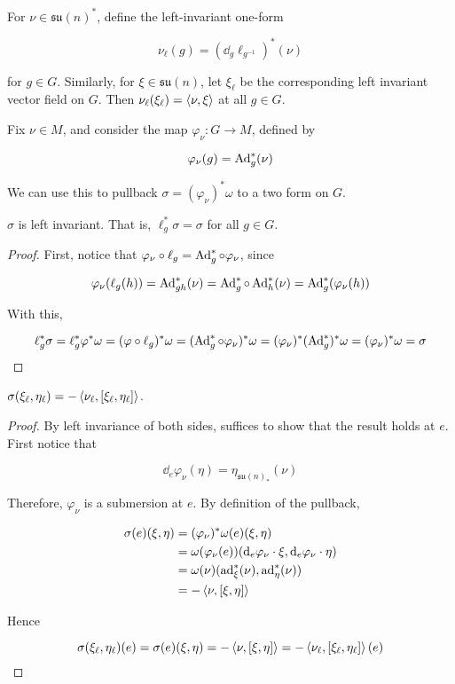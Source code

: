 \documentclass{article}
\newcommand{\su}{\mathfrak{su}}
\begin{document}
For \(\nu \in \su(n)^*\), define the left-invariant one-form

\[\nu_\ell(g) = (\dd_g\ell_{g^{-1}})^*(\nu)\]

for \(g \in G\). Similarly, for \(\xi \in \su(n)\), let \(\xi_\ell\) be the corresponding left invariant vector field on \(G\). Then \(\nu_\ell(\xi_\ell) = \left\langle \nu, \xi \right\rangle\) at all \(g \in G\).

Fix \(\nu \in  M\), and consider the map \(\varphi_\nu : G \to  M\), defined by

\[\varphi_\nu(g) = \operatorname{Ad}_g^*(\nu)\]

We can use this to pullback \(\sigma = (\varphi_\nu)^*\omega\) to a two form on \(G\).

\begin{lemma}
    \(\sigma\) is left invariant. That is, \(\ell_g^*\sigma = \sigma\) for all \(g \in G\).
\end{lemma}

\begin{proof}
    First, notice that \(\varphi_\nu \circ \ell_g = \operatorname{Ad}_g^* \circ \varphi_\nu\), since

    \[\varphi_\nu(\ell_g(h)) = \operatorname{Ad}_{gh}^*(\nu) = \operatorname{Ad}_g^*\circ \operatorname{Ad}_h^*(\nu) = \operatorname{Ad}_g^*(\varphi_\nu(h))\]

    With this,

    \[\ell_g^*\sigma = \ell_g^*\varphi^*\omega = (\varphi\circ\ell_g)^*\omega = (\operatorname{Ad}_g^* \circ \varphi_\nu)^*\omega = (\varphi_\nu)^*(\operatorname{Ad}_g^*)^*\omega = (\varphi_\nu)^*\omega = \sigma\]
\end{proof}

\begin{lemma}
    \(\sigma(\xi_\ell, \eta_\ell) = -\left\langle \nu_\ell, [\xi_\ell, \eta_\ell] \right\rangle\).
\end{lemma}

\begin{proof}
    By left invariance of both sides, suffices to show that the result holds at \(e\). First notice that

    \[\dd_e\varphi_\nu(\eta) = \eta_{\su(n)_*}(\nu)\]

    Therefore, \(\varphi_\nu\) is a submersion at \(e\). By definition of the pullback,

    \begin{align*}
        \sigma(e)(\xi, \eta) &= (\varphi_\nu)^*\omega(e)(\xi, \eta)\\ 
        &= \omega(\varphi_\nu(e))(\dd_e\varphi_\nu \cdot \xi, \dd_e\varphi_\nu\cdot\eta) \\
        &= \omega(\nu)(\operatorname{ad}_\xi^*(\nu), \operatorname{ad}_\eta^*(\nu)) \\
        &= -\left\langle \nu, [\xi, \eta] \right\rangle
    \end{align*}

    Hence

    \[\sigma(\xi_\ell, \eta_\ell)(e) = \sigma(e)(\xi, \eta) = -\left\langle \nu, [\xi, \eta] \right\rangle = -\left\langle \nu_\ell, [\xi_\ell, \eta_\ell] \right\rangle(e)\]
\end{proof}
\end{document}
